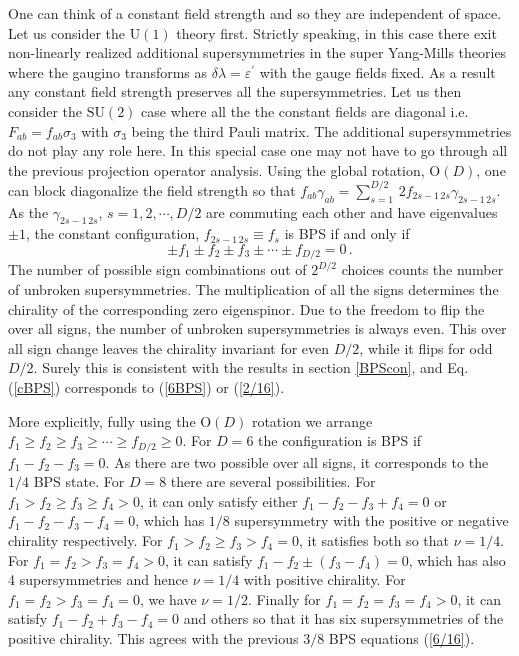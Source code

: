 \documentclass[a4paper,11pt]{article}
\begin{document}
One can think of a constant field strength and so they are independent of space.  Let us consider the   $\mbox{U}(1)$ theory first. Strictly
speaking, in this case there exit non-linearly realized additional supersymmetries in the super Yang-Mills theories where the gaugino transforms as
$\delta \lambda=\varepsilon^{\prime}$ with the gauge fields fixed.  As a result  any constant field strength  preserves all the  supersymmetries.
Let us then consider the $\mbox{SU}(2)$ case where all the the constant fields are diagonal i.e. $F_{ab}= f_{ab}\sigma_{3}$ with $\sigma_{3}$ being
the third Pauli matrix. The additional supersymmetries do not play any role here. In this special case one may not have to go through all the
previous projection operator analysis. Using the global rotation,  $\mbox{O}(D)$, one can block diagonalize the field strength so that
$f_{ab}\gamma_{ab}=\sum_{s=1}^{D/2}\,2 f_{{\scriptscriptstyle 2}s{\scriptscriptstyle -} \!{\scriptscriptstyle 1}\,{\scriptscriptstyle
2}s}\gamma_{{\scriptscriptstyle 2}s{\scriptscriptstyle -} \!{\scriptscriptstyle 1}\,{\scriptscriptstyle 2}s}$. As the $\gamma_{{\scriptscriptstyle
2}s{\scriptscriptstyle -}\!{\scriptscriptstyle 1} \,{\scriptscriptstyle 2}s}$,  $s=1,2,\cdots,D/2$ are commuting each other and have eigenvalues
$\pm 1$, the constant configuration, $f_{{\scriptscriptstyle 2}s{\scriptscriptstyle -} \!{\scriptscriptstyle 1}\,{\scriptscriptstyle 2}s}\equiv
f_{s}$ is  BPS if and only if
\begin{equation}
\pm f_1 \pm f_2 \pm f_3 \pm \cdots\pm f_{D/2}=0\,. \label{cBPS}
\end{equation}
The number of possible  sign combinations out of  $2^{D/2}$ choices counts the number of unbroken supersymmetries. The multiplication of all the
signs determines the chirality of the corresponding zero eigenspinor.  Due to the freedom to flip the over all signs, the number of unbroken
supersymmetries is always even. This over all sign change  leaves the chirality invariant for even $D/2$, while it flips for odd $D/2$. Surely this
is consistent with the results in section \ref{BPScon}, and  Eq.(\ref{cBPS}) corresponds to (\ref{6BPS}) or (\ref{2/16}).



More explicitly, fully using the $\mbox{O}(D)$ rotation  we arrange $f_1\ge f_2 \ge f_3 \ge \cdots\ge  f_{D/2}\ge 0$.  For $D=6$ the configuration is
BPS if $f_1-f_2-f_3=0$. As there are two possible over all signs, it corresponds to the ${1/4}$ BPS state. For $D=8$  there are several
possibilities. For $f_1>f_2\ge f_3 \ge f_4 > 0$, it can only satisfy either $f_{1}-f_{2}-f_{3}+f_{4}=0$ or $f_{1}-f_{2}-f_{3}-f_{4}=0$, which has
${1/8}$ supersymmetry with the positive or negative chirality respectively. For $f_1>f_2\ge f_3 > f_4 = 0$, it satisfies both so that $\nu={1/4}$.
For $f_1=f_2>f_3=f_4>0$, it can satisfy $f_1-f_2 \pm (f_3-f_4)=0$, which has also 4 supersymmetries and hence $\nu={1/4}$ with positive chirality.
For $f_1=f_2>f_3=f_4=0$, we have $\nu={1/2}$.  Finally for $f_1=f_2=f_3=f_4>0$, it can satisfy $f_1-f_2+f_3-f_4=0$ and others so that it has six
supersymmetries of the positive chirality. This agrees with the previous ${3/8}$ BPS equations (\ref{6/16}).
\end{document}
